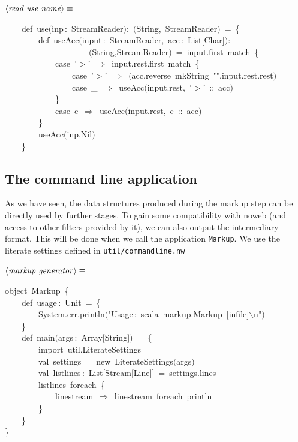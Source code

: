 \documentclass[a4paper,12pt]{article}
\begin{document}
$\left<\mbox{\emph{read use name}}\right>\equiv$
\begin{program}~~~~{\vem def}~use$($inp\,{\rm :}~StreamReader$)${\rm :}~$($String,~StreamReader$)$~=~{\small\{}
\\~~~~~~~~{\vem def}~useAcc$($input\,{\rm :}~StreamReader,~acc\,{\rm :}~List$[$Char$]$$)${\rm :}
\\~~~~~~~~~~~~~~~~~~~~$($String,StreamReader$)$~=~input.first~{\vem match}~{\small\{}
\\~~~~~~~~~~~~{\vem case}~'$>$'~$\Rightarrow$~input.rest.first~{\vem match}~{\small\{}
\\~~~~~~~~~~~~~~~~{\vem case}~'$>$'~$\Rightarrow$~$($acc.reverse~mkString~"",input.rest.rest$)$
\\~~~~~~~~~~~~~~~~{\vem case}~\_~$\Rightarrow$~useAcc$($input.rest,~'$>$'~{\rm :}{\rm :}~acc$)$
\\~~~~~~~~~~~~{\small\}}
\\~~~~~~~~~~~~{\vem case}~c~$\Rightarrow$~useAcc$($input.rest,~c~{\rm :}{\rm :}~acc$)$
\\~~~~~~~~{\small\}}
\\[0.5em]~~~~~~~~useAcc$($inp,Nil$)$
\\~~~~{\small\}}
\\[0.5em]
\end{program}
\subsection{The command line application}
As we have seen, the data structures produced during the markup step can
be directly used by further stages. To gain some compatibility with noweb
(and access to other filters provided by it), we can also output the
intermediary format. This will be done when we call the application
\texttt{Markup}. We use the literate settings defined in \texttt{util/commandline.nw}

$\left<\mbox{\emph{markup generator}}\right>\equiv$
\begin{program}{\vem object}~Markup~{\small\{}
\\[0.5em]~~~~{\vem def}~usage\,{\rm :}~Unit~=~{\small\{}
\\~~~~~~~~System.err.println$($"Usage\,{\rm :}~scala~markup.Markup~$[$infile$]$$\backslash$n"$)$
\\~~~~{\small\}}
\\[0.5em]~~~~{\vem def}~main$($args\,{\rm :}~Array$[$String$]$$)$~=~{\small\{}
\\~~~~~~~~{\vem import}~util.LiterateSettings
\\[0.5em]~~~~~~~~{\vem val}~settings~=~{\vem new}~LiterateSettings$($args$)$
\\[0.5em]~~~~~~~~{\vem val}~listlines\,{\rm :}~List$[$Stream$[$Line$]$$]$~=~settings.lines
\\~~~~~~~~listlines~foreach~{\small\{}
\\~~~~~~~~~~~~linestream~$\Rightarrow$~linestream~foreach~println
\\~~~~~~~~{\small\}}
\\~~~~{\small\}}
\\{\small\}}
\end{program}
\end{document}
